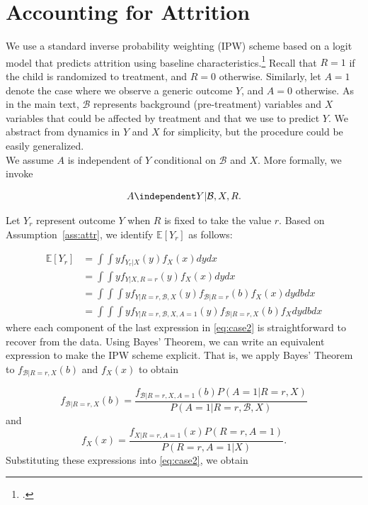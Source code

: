 \section{Accounting for Attrition} \label{appendix:attrition}

\noindent We use a standard inverse probability weighting (IPW) scheme based on a logit model that predicts attrition using baseline characteristics.\footnote{\citet{Horvitz_Thompson_1952_JASA}.} Recall that $R = 1$ if the child is randomized to treatment, and $R = 0$ otherwise. Similarly, let $A = 1$ denote the case where we observe a generic outcome $Y$, and $A = 0$ otherwise. As in the main text, $\mathcal{B}$ represents background (pre-treatment) variables and $X$ variables that could be affected by treatment and that we use to predict $Y$. We abstract from dynamics in $Y$ and $X$ for simplicity, but the procedure could be easily generalized.\\

\noindent We assume $A$ is independent of $Y$ conditional on $\mathcal{B}$ and $X$. More formally, we invoke


\begin{assumption} \label{ass:attr}
	\begin{align*}
		A \independent Y | \mathcal{B}, X, R.
	\end{align*}
\end{assumption}

\noindent Let $Y_{r}$ represent outcome $Y$ when $R$ is fixed to take the value $r$. Based on Assumption~\ref{ass:attr}, we identify $\mathbb{E}[Y_r]$ as follows:

\begin{align} \label{eq:case2}
\mathbb{E}[Y_r] & = \int \int y f_{Y_r|X}(y) f_X(x) dydx \\ \nonumber
	           & = \int \int y f_{Y|X,R=r}(y) f_X(x) dydx \\ \nonumber
				& = \int \int \int y f_{Y|R=r,\mathcal{B},X}(y) f_{\mathcal{B}|R=r}(b) f_X(x) dydbdx \\ \nonumber
				& = \int \int \int y f_{Y|R=r,\mathcal{B},X,A=1}(y) f_{\mathcal{B}|R=r,X}(b) f_X dydbdx
\end{align}
\noindent where each component of the last expression in \eqref{eq:case2} is straightforward to recover from the data. Using Bayes' Theorem, we can write an equivalent expression to make the IPW scheme explicit. That is, we apply Bayes' Theorem to $f_{\mathcal{B}|R=r,X}(b)$ and $f_X(x)$ to obtain

\begin{equation*}
f_{\mathcal{B}|R=r,X}(b) = \frac{f_{\mathcal{B}|R=r,X,A=1}(b) P(A=1|R=r,X)}{P(A=1|R=r,\mathcal{B},X)}
\end{equation*}
and
\begin{equation*}
	f_X(x) = \frac{f_{X|R=r,A=1}(x) P(R=r,A=1)}{P(R=r,A=1|X)}.
\end{equation*}
\noindent Substituting these expressions into \eqref{eq:case2}, we obtain

